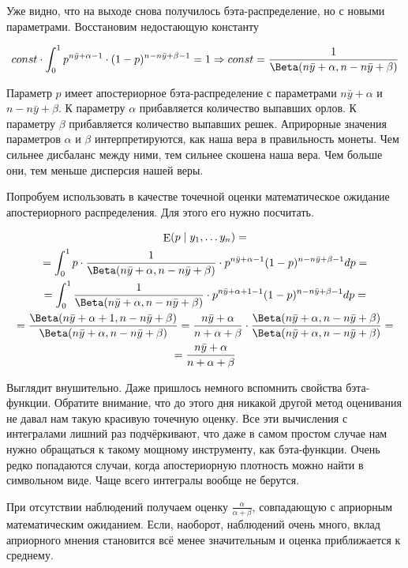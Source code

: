 \documentclass[12pt, a4paper, oneside]{extreport}
\DeclareMathOperator{\E}{\mathop{E}}
\def \b{\beta}
\theoremstyle{plain}              %
\theoremstyle{definition}         %
\begin{document}
Уже видно, что на выходе снова получилось бэта-распределение, но с новыми параметрами. Восстановим недостающую константу

\[ const \cdot \int_0^1 p^{n \bar y + \alpha - 1} \cdot (1-p)^{n - n\bar y + \b - 1} = 1 \Rightarrow  const = \frac{1}{\Beta(n \bar y + \alpha, n-n \bar y + \beta)} \]

Параметр $p$ имеет апостериорное бэта-распределение с параметрами $n \bar y + \alpha$ и $ n - n \bar y + \beta$.  К параметру $\alpha$ прибавляется количество выпавших орлов. К параметру $\beta$ прибавляется количество выпавших решек. Априрорные значения параметров $\alpha$ и $\beta$  интерпретируются, как наша вера в правильность монеты. Чем сильнее дисбаланс между ними, тем сильнее скошена наша вера. Чем больше они, тем меньше дисперсия нашей веры. 

Попробуем использовать в качестве точечной оценки математическое ожидание апостериорного распределения. Для этого его нужно посчитать. 

	\begin{multline*}
\E(p \mid y_1, \ldots y_n)  = \\ =  \int_0^1 p \cdot \frac{1}{\Beta(n \bar y + \alpha,n-n \bar y + \b)} \cdot p^{n \bar y + \alpha - 1} (1-p)^{n - n \bar{y} + \beta - 1} dp = \\ = \int_0^1 \frac{1}{\Beta(n \bar y + \alpha ,n-n \bar y + \beta)} \cdot p^{n \bar y + \alpha + 1 - 1} (1-p)^{n - n \bar{y} + \beta - 1} dp =  \\ =   \frac{\Beta(n \bar y + \alpha + 1,n-n \bar y + \beta)}{\Beta(n \bar y + \alpha, n-n \bar y + \beta)} =  \frac{n \bar y + \alpha}{n + \alpha + \b} \cdot \frac{\Beta(n \bar y + \alpha,n-n \bar y + \beta)}{\Beta(n \bar y + \alpha, n-n \bar y + \beta)} = \\ =\frac{n \bar y + \alpha}{n + \alpha + \beta}
\end{multline*}

Выглядит внушительно. Даже пришлось немного вспомнить свойства бэта-функции. Обратите внимание, что до этого дня никакой другой метод оценивания не давал нам такую красивую точечную оценку. Все эти вычисления с интегралами лишний раз подчёркивают, что даже в самом простом случае нам нужно обращаться к такому мощному инструменту, как бэта-функции. Очень редко попадаются случаи, когда апостериорную плотность можно найти в символьном виде. Чаще всего интегралы вообще не берутся.  

При отсутствии наблюдений получаем оценку $\frac{\alpha}{\alpha + \b}$, совпадающую с априорным математическим ожиданием. Если, наоборот, наблюдений очень много, вклад априорного мнения становится всё менее значительным и оценка приближается к среднему. 
\end{document}
